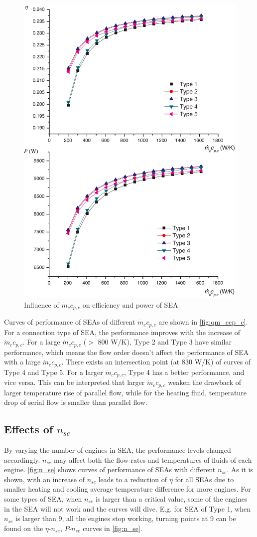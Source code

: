 \begin{figure}[htbp]
\centering
	\includegraphics[width = 0.7\columnwidth]{fig/qm_ccp_c}
	\caption{Influence of $\dot{m}_cc_{p,c}$ on efficiency and power of SEA}
	\label{fig:qm_ccp_c}
\end{figure}

Curves of performance of SEAs of different $\dot{m}_cc_{p,c}$ are shown in \autoref{fig:qm_ccp_c}. For a connection type of SEA, the performance improves with the increase of $\dot{m}_cc_{p,c}$. For a large $\dot{m}_cc_{p,c}$ ($>$ 800 W/K), Type 2 and Type 3 have similar performance, which means the flow order doesn't affect the performance of SEA with a large $\dot{m}_cc_{p,c}$. There exists an intersection point (at 830 W/K) of curves of Type 4 and Type 5. For a larger $\dot{m}_cc_{p,c}$, Type 4 has a better performance, and vice versa. This can be interpreted that larger $\dot{m}_cc_{p,c}$ weaken the drawback of larger temperature rise of parallel flow, while for the heating fluid, temperature drop of serial flow is smaller than parallel flow.

\subsection{Effects of $n_{se}$}

By varying the number of engines in SEA, the performance levels changed accordingly. $n_{se}$ may affect both the flow rates and temperatures of fluids of each engine. \autoref{fig:n_se} shows curves of performance of SEAs with different $n_{se}$. As it is shown, with an increase of $n_{se}$ leads to a reduction of $\eta$ for all SEAs due to smaller heating and cooling average temperature difference for more engines. For some types of SEA, when $n_{se}$ is larger than a critical value, some of the engines in the SEA will not work and the curves will dive. E.g. for SEA of Type 1, when $n_{se}$ is larger than 9, all the engines stop working, turning points at 9 can be found on the $\eta$-$n_{se}$, $P$-$n_{se}$ curves in \autoref{fig:n_se}.

